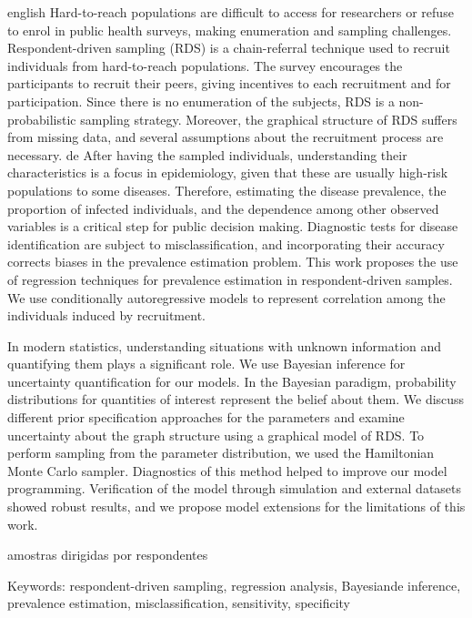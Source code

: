 \setlength{\absparsep}{18pt} 

\begin{resumo}[Abstract]
 \begin{otherlanguage*}{english}
    Hard-to-reach populations are difficult to access for researchers or refuse to enrol in public health surveys, making enumeration and sampling challenges. Respondent-driven sampling (RDS) is a chain-referral technique used to recruit individuals from hard-to-reach populations. The survey encourages the participants to recruit their peers, giving incentives to each recruitment and for participation. Since there is no enumeration of the subjects, RDS is a non-probabilistic sampling strategy. Moreover, the graphical structure of RDS suffers from missing data, and several assumptions about the recruitment process are necessary. 
    de
    After having the sampled individuals, understanding their characteristics
    is a focus in epidemiology, given that these are usually high-risk
    populations to some diseases. Therefore, estimating the disease
    prevalence, the proportion of infected individuals, and the dependence
    among other observed variables is a critical step for public decision
    making. Diagnostic tests for disease identification are subject to
    misclassification, and incorporating their accuracy corrects biases in the
    prevalence estimation problem. This work proposes the use of regression
    techniques for prevalence estimation in respondent-driven samples. We use
    conditionally autoregressive models to represent correlation among the
    individuals induced by recruitment.
    
    In modern statistics, understanding situations with unknown information
    and quantifying them plays a significant role. We use Bayesian inference
    for uncertainty quantification for our models. In the Bayesian paradigm,
    probability distributions for quantities of interest represent the belief
    about them. We discuss different prior specification approaches for the
    parameters and examine uncertainty about the graph structure using a
    graphical model of RDS. To perform sampling from the parameter
    distribution, we used the Hamiltonian Monte Carlo sampler. Diagnostics of
    this method helped to improve our model programming. Verification of the
    model through simulation and external datasets showed robust results, and
    we propose model extensions for the limitations of this work.
 \end{otherlanguage*}amostras dirigidas por respondentes

 Keywords: respondent-driven sampling, regression analysis, Bayesiande
 inference, prevalence estimation, misclassification, sensitivity, specificity
\end{resumo}

